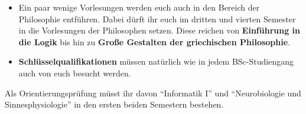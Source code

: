 \begin{itemize}
\item Ein paar wenige Vorlesungen werden euch auch in den Bereich der 
Philosophie entführen. Dabei dürft ihr euch im dritten und vierten Semester in 
die Vorlesungen der Philosophen setzen. Diese reichen von  \textbf{Einführung 
in die Logik} bis hin zu \textbf{Große Gestalten der griechischen Philosophie}.

\item \textbf{Schlüsselqualifikationen} müssen natürlich wie in jedem 
BSc-Studiengang auch von euch besucht werden.

\end{itemize}

Als Orientierungsprüfung müsst ihr davon "`Informatik I"' und "`Neurobiologie 
und Sinnesphysiologie"' in den ersten beiden Semestern bestehen.

